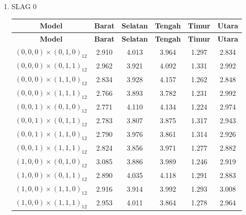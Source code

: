 \begin{enumerate}[label=\alph*.]
    \label{lampiran:rmse-uniform}
    \item SLAG 0
    \begin{longtable}{|c|c|c|c|c|c|}
        \hline
        \textbf{Model} & \textbf{Barat} & \textbf{Selatan} & \textbf{Tengah} & \textbf{Timur} & \textbf{Utara} \\
        \hline
        \endfirsthead

        \hline
        \textbf{Model} & \textbf{Barat} & \textbf{Selatan} & \textbf{Tengah} & \textbf{Timur} & \textbf{Utara} \\
        \hline
        \endhead

        \hline
        \endfoot
        \hline
        \endlastfoot

        {$(0,0,0) \times (0,1,0)_{12}$} & 2.910 & 4.013 & 3.964 & 1.297 & 2.834 \\ \hline
        {$(0,0,0) \times (0,1,1)_{12}$} & 2.962 & 3.921 & 4.092 & 1.331 & 2.992 \\ \hline
        {$(0,0,0) \times (1,1,0)_{12}$} & 2.834 & 3.928 & 4.157 & 1.262 & 2.848 \\ \hline
        {$(0,0,0) \times (1,1,1)_{12}$} & 2.766 & 3.893 & 3.782 & 1.231 & 2.992 \\ \hline

        {$(0,0,1) \times (0,1,0)_{12}$} & 2.771 & 4.110 & 4.134 & 1.224 & 2.974 \\ \hline
        {$(0,0,1) \times (0,1,1)_{12}$} & 2.783 & 3.807 & 3.875 & 1.317 & 2.943 \\ \hline
        {$(0,0,1) \times (1,1,0)_{12}$} & 2.790 & 3.976 & 3.861 & 1.314 & 2.926 \\ \hline
        {$(0,0,1) \times (1,1,1)_{12}$} & 2.824 & 3.856 & 3.971 & 1.277 & 2.882 \\ \hline

        {$(1,0,0) \times (0,1,0)_{12}$} & 3.085 & 3.886 & 3.989 & 1.246 & 2.919 \\ \hline
        {$(1,0,0) \times (0,1,1)_{12}$} & 2.890 & 4.035 & 4.118 & 1.291 & 2.883 \\ \hline
        {$(1,0,0) \times (1,1,0)_{12}$} & 2.916 & 3.914 & 3.992 & 1.293 & 3.008 \\ \hline
        {$(1,0,0) \times (1,1,1)_{12}$} & 2.953 & 4.011 & 3.864 & 1.278 & 2.964 \\ \hline


\end{longtable}
\end{enumerate}
